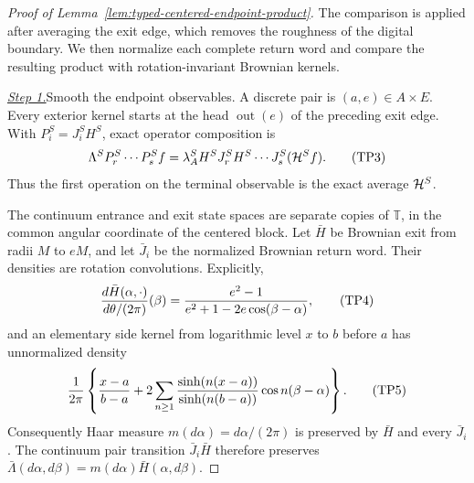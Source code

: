 \begin{proof}[Proof of Lemma~\ref{lem:typed-centered-endpoint-product}]
The comparison is applied after averaging the exit edge, which removes the
roughness of the digital boundary. We then normalize each complete return
word and compare the resulting product with rotation-invariant Brownian
kernels.

\smallskip\noindent
\underline{\textit{Step 1.}}\quad Smooth the endpoint observables.
A discrete pair is
\((a,e)\in A\times E\).  Every exterior kernel starts at the head
\(\operatorname{out}(e)\) of the preceding exit edge.  With
\(P_i^S=J_i^SH^S\), exact operator composition is
\begin{equation}
 \Lambda^SP_r^S\cdots P_s^Sf
 =\lambda_A^SH^SJ_r^SH^S\cdots J_s^S({\cal H}^Sf).         \tag{TP3}\label{eq:tu-TP3}
\end{equation}
Thus the first operation on the terminal observable is the exact average
\({\cal H}^S\).

The continuum entrance and exit state spaces are separate copies of
\(\mathbb T\), in the common angular coordinate of the centered block.
Let \(\bar H\) be Brownian exit from radii \(M\) to \(eM\), and let
\(\bar J_i\) be the normalized Brownian return word.  Their densities are
rotation convolutions.  Explicitly,
\begin{equation}
 {d\bar H(\alpha,\cdot)\over d\theta/(2\pi)}(\beta)
 ={e^2-1\over e^2+1-2e\cos(\beta-\alpha)},                \tag{TP4}\label{eq:tu-TP4}
\end{equation}
and an elementary side kernel from logarithmic level \(x\) to \(b\) before
\(a\) has unnormalized density
\begin{equation}
 {1\over2\pi}\left\{{x-a\over b-a}
 +2\sum_{n\ge1}{\sinh(n(x-a))\over\sinh(n(b-a))}
       \cos n(\beta-\alpha)\right\}.                      \tag{TP5}\label{eq:tu-TP5}
\end{equation}
Consequently Haar measure \(m(d\alpha)=d\alpha/(2\pi)\) is preserved
by \(\bar H\) and every \(\bar J_i\). The continuum pair transition
\(\bar J_i\bar H\) therefore preserves
\(\bar\Lambda(d\alpha,d\beta)=m(d\alpha)\bar H(\alpha,d\beta)\).


\end{proof}
